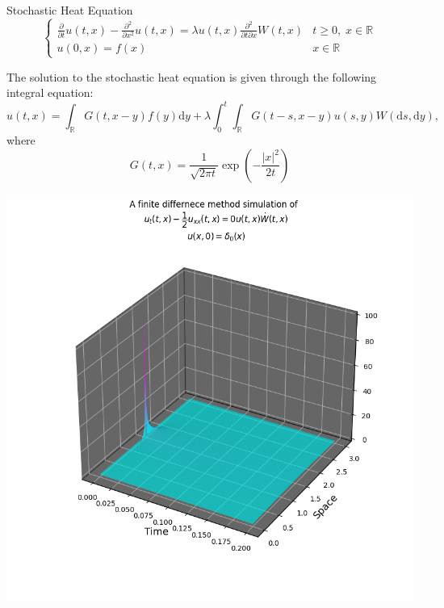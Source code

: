 \documentclass{beamer}%
\numberwithin{equation}{section}
\newcommand{\R}{\mathbb{R}}
\newcommand{\ud}{\ensuremath{\mathrm{d} }}
\begin{document}
	\begin{frame}[t]{Stochastic Heat Equation}
		\[
		\begin{cases}
		\frac{\partial}{\partial t} u(t,x) - \frac{\partial^2}{\partial x^2} u(t,x) = \lambda u(t,x) \frac{\partial^2}{\partial t \partial x}W(t,x) & t \ge 0, \; x\in \R \\
		u(0, x) = f(x) & x \in \R
		\end{cases}
		\]
		\vspace{.1 in}
		
		The solution to the stochastic heat equation is given through the following integral equation:
		\[
		u(t,x) = \int_{\R} G(t, x-y) f(y) \ud y + \lambda \int_0^t \int_{\R} G(t-s,x-y) u(s,y) W(\ud s, \ud y),
		\]
		where
		\[
		G(t,x) = \frac{1}{\sqrt{2 \pi t} }\exp\left(-\frac{|x|^2}{2t}\right)
		\]
	\end{frame}
	
	\begin{frame}
		\centering
		\includegraphics[scale=.5]{SHEdeltaNoise0.png}
	\end{frame}
	
\end{document}
